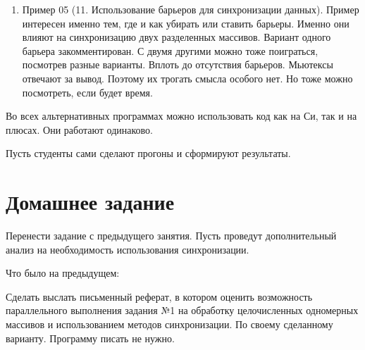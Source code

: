 \begin{enumerate}
    \item Пример 05 (11. Использование барьеров для синхронизации данных). Пример интересен именно тем, где и как убирать или ставить барьеры. Именно они влияют на синхронизацию двух разделенных массивов. Вариант одного барьера закомментирован. С двумя другими можно тоже поиграться, посмотрев разные варианты. Вплоть до отсутствия барьеров. Мьютексы отвечают за вывод. Поэтому их трогать смысла особого нет. Но тоже можно посмотреть, если будет время.
\end{enumerate}

Во всех альтернативных программах можно использовать код как на Си, так и на плюсах. Они работают одинаково.

Пусть студенты сами сделают прогоны и сформируют результаты.

\section{Домашнее задание}

Перенести задание с предыдущего занятия. Пусть проведут дополнительный анализ на необходимость использования синхронизации.

Что было на предыдущем:

Сделать выслать письменный реферат, в котором оценить возможность параллельного выполнения задания №1 на обработку целочисленных одномерных массивов и использованием методов синхронизации. По своему сделанному варианту. Программу писать не нужно.
